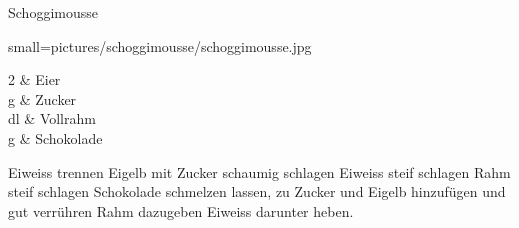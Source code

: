 \begin{recipe}
	[
	preparationtime = {\unit[20]{min}},
	portion,
	calory,
	source
	]
	{Schoggimousse}
	
	\graph
	{
		small=pictures/schoggimousse/schoggimousse.jpg
	}
	
	\ingredients
	{
		2 & Eier \\
		\unit[50]{g} & Zucker \\
		\unit[5]{dl} & Vollrahm \\
		\unit[200]{g} & Schokolade \\
	}
	
	\preparation
	{
		\step Eiweiss trennen
		\step Eigelb mit Zucker schaumig schlagen
		\step Eiweiss steif schlagen
		\step Rahm steif schlagen
		\step Schokolade schmelzen lassen, zu Zucker und Eigelb hinzufügen und gut verrühren
		\step Rahm dazugeben
		\step Eiweiss darunter heben.
	}
\end{recipe}